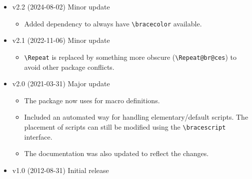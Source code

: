 \documentclass[10pt]{ltxdockit}[2011/03/25]
\begin{document}
\begin{itemize}
  \item v2.2 (2024-08-02) Minor update
  
  \begin{itemize}
    \item
    Added \href{http://ctan.org/pkg/xcolor}{} dependency to always have \lstinline|\bracecolor| available.
  \end{itemize}
  
  \item v2.1 (2022-11-06) Minor update
  
  \begin{itemize}
    \item
    \lstinline|\Repeat| is replaced by something more obscure (\lstinline|\Repeat@br@ces|) to avoid other package conflicts.
  \end{itemize}
  
  \item v2.0 (2021-03-31) Major update
  
  \begin{itemize}
    \item
    The package now uses \href{http://ctan.org/pkg/xparse}{} for macro definitions.
    
    \item
    Included an automated way for handling elementary/default scripts. The placement of scripts can still be modified using the \lstinline|\bracescript| interface.
    
    \item
    The documentation was also updated to reflect the changes.
  \end{itemize}
  
  \item v1.0 (2012-08-31) Initial release
\end{itemize}
\end{document}
